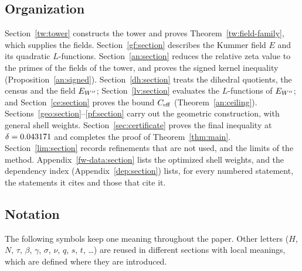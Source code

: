 \subsection{Organization}\label{intro:organization}
Section~\ref{tw:tower} constructs the tower and proves
Theorem~\ref{tw:field-family}, which supplies the fields.
Section~\ref{gf:section} describes the Kummer field $E$ and its quadratic
$L$-functions. Section~\ref{an:section} reduces the relative zeta value
to the primes of the fields of the tower, and proves the signed kernel
inequality (Proposition~\ref{an:signed}). Section~\ref{dh:section} treats
the dihedral quotients, the census and the field $E_{W''}$;
Section~\ref{lv:section} evaluates the $L$-functions of $E_{W''}$; and
Section~\ref{ce:section} proves the bound $C_{\rm eff}$
(Theorem~\ref{an:ceiling}). Sections~\ref{geo:section}--\ref{pf:section}
carry out the geometric construction, with
general shell weights. Section~\ref{sec:certificate} proves the final
inequality at $\delta=0.043171$ and completes the proof of
Theorem~\ref{thm:main}. Section~\ref{lim:section} records refinements that
are not used, and the limits of the method. Appendix~\ref{fw-data:section}
lists the optimized shell weights, and the dependency index
(Appendix~\ref{dep:section}) lists, for every numbered statement, the
statements it cites and those that cite it.

\subsection{Notation}\label{intro:notation}
The following symbols keep one meaning throughout the paper. Other letters
($H$, $N$, $\tau$, $\beta$, $\gamma$, $\sigma$, $\nu$, $q$, $s$, $t$, \dots)
are reused in different sections with local meanings, which are defined
where they are introduced.

